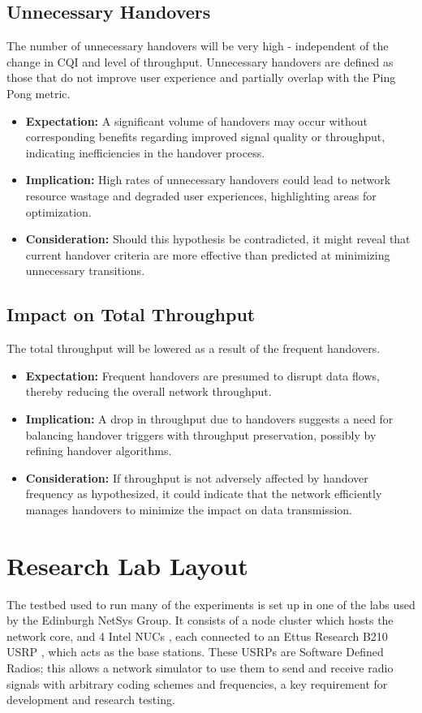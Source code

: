 \subsection{Unnecessary Handovers}
The number of unnecessary handovers will be very high - independent of the change in CQI and level of throughput. Unnecessary handovers are defined as those that do not improve user experience and partially overlap with the Ping Pong metric.
\begin{itemize}
    \item \textbf{Expectation:} A significant volume of handovers may occur without corresponding benefits regarding improved signal quality or throughput, indicating inefficiencies in the handover process.
    \item \textbf{Implication:} High rates of unnecessary handovers could lead to network resource wastage and degraded user experiences, highlighting areas for optimization.
    \item \textbf{Consideration:} Should this hypothesis be contradicted, it might reveal that current handover criteria are more effective than predicted at minimizing unnecessary transitions.
\end{itemize}

\subsection{Impact on Total Throughput}
The total throughput will be lowered as a result of the frequent handovers.
\begin{itemize}
    \item \textbf{Expectation:} Frequent handovers are presumed to disrupt data flows, thereby reducing the overall network throughput.
    \item \textbf{Implication:} A drop in throughput due to handovers suggests a need for balancing handover triggers with throughput preservation, possibly by refining handover algorithms.
    \item \textbf{Consideration:} If throughput is not adversely affected by handover frequency as hypothesized, it could indicate that the network efficiently manages handovers to minimize the impact on data transmission.
\end{itemize}


\section{Research Lab Layout}
The testbed used to run many of the experiments is set up in one of the labs used by the Edinburgh NetSys Group. It consists of a node cluster which hosts the network core, and 4 Intel NUCs \insertref, each connected to an Ettus Research B210 USRP \insertref, which acts as the base stations. These USRPs are Software Defined Radios; this allows a network simulator to use them to send and receive radio signals with arbitrary coding schemes and frequencies, a key requirement for development and research testing.

